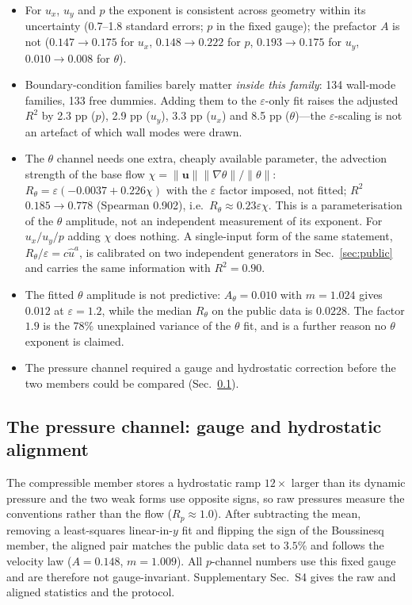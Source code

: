 \documentclass[preprint,11pt,a4paper,times,doubleblind]{elsarticle}
\begin{document}
\begin{itemize}
\item For $u_x$, $u_y$ and $p$ the exponent is consistent across geometry within its uncertainty
(0.7--1.8 standard errors; $p$ in the fixed gauge); the
prefactor $A$ is not ($0.147\to0.175$ for $u_x$, $0.148\to0.222$ for $p$, $0.193\to0.175$ for
$u_y$, $0.010\to0.008$ for $\theta$).
\item Boundary-condition families barely matter \emph{inside this family}: 134 wall-mode families,
133 free dummies. Adding them to the $\varepsilon$-only fit raises the adjusted $R^2$ by 2.3 pp
($p$), 2.9 pp ($u_y$), 3.3 pp ($u_x$) and 8.5 pp ($\theta$)---the $\varepsilon$-scaling is not an
artefact of which wall modes were drawn.
\item The $\theta$ channel needs one extra, cheaply available parameter, the advection strength of
the base flow $\chi=\|\bm u\|\|\nabla\theta\|/\|\theta\|$:
$R_\theta=\varepsilon(-0.0037+0.226\chi)$ with the $\varepsilon$ factor imposed, not fitted;
$R^2$ $0.185\to0.778$ (Spearman 0.902), i.e.\ $R_\theta\approx0.23\varepsilon\chi$. This is a
parameterisation of the $\theta$ amplitude, not an independent measurement of its exponent. For
$u_x/u_y/p$ adding $\chi$ does nothing. A single-input
form of the same statement, $R_\theta/\varepsilon=c\hat u^a$, is calibrated on two independent
generators in Sec.~\ref{sec:public} and carries the same information with $R^2=0.90$.
\item The fitted $\theta$ amplitude is not predictive: $A_\theta=0.010$ with $m=1.024$ gives $0.012$
at $\varepsilon=1.2$, while the median $R_\theta$ on the public data is $0.0228$. The factor
$1.9$ is the 78\% unexplained variance of the $\theta$ fit, and is a further reason no $\theta$
exponent is claimed.
\item The pressure channel required a gauge and hydrostatic correction before the two members
could be compared (Sec.~\ref{sec:pressure}).
\end{itemize}
\subsection{The pressure channel: gauge and hydrostatic alignment}
\label{sec:pressure}

The compressible member stores a hydrostatic ramp $12\times$ larger than its dynamic pressure and
the two weak forms use opposite signs, so raw pressures measure the conventions rather than the
flow ($R_p\approx1.0$). After subtracting the mean, removing a least-squares linear-in-$y$ fit and
flipping the sign of the Boussinesq member, the aligned pair matches the public data set to
$3.5\%$ and follows the velocity law ($A=0.148$, $m=1.009$). All $p$-channel numbers use this fixed
gauge and are therefore not gauge-invariant. Supplementary Sec.~S4 gives the raw and aligned
statistics and the protocol.
\end{document}
